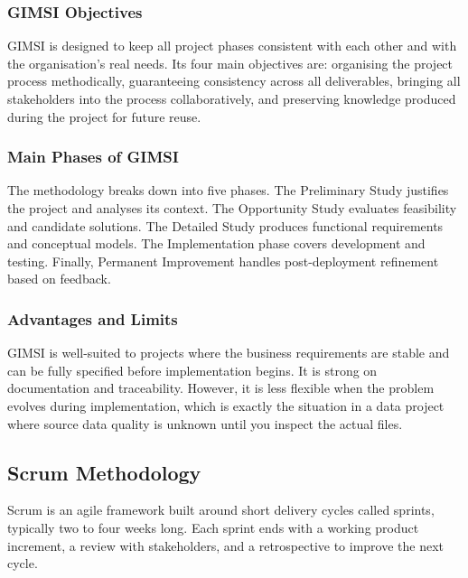 \documentclass[12pt, a4paper]{report}
\begin{document}

\subsubsection{GIMSI Objectives}

GIMSI is designed to keep all project phases consistent with each other and with the
organisation's real needs. Its four main objectives are: organising the project
process methodically, guaranteeing consistency across all deliverables, bringing
all stakeholders into the process collaboratively, and preserving knowledge produced
during the project for future reuse.

\subsubsection{Main Phases of GIMSI}

The methodology breaks down into five phases. The Preliminary Study justifies the
project and analyses its context. The Opportunity Study evaluates feasibility and
candidate solutions. The Detailed Study produces functional requirements and
conceptual models. The Implementation phase covers development and testing. Finally,
Permanent Improvement handles post-deployment refinement based on feedback.

\subsubsection{Advantages and Limits}

GIMSI is well-suited to projects where the business requirements are stable and
can be fully specified before implementation begins. It is strong on documentation
and traceability. However, it is less flexible when the problem evolves during
implementation, which is exactly the situation in a data project where source data
quality is unknown until you inspect the actual files.

\subsection{Scrum Methodology}

Scrum is an agile framework built around short delivery cycles called sprints,
typically two to four weeks long. Each sprint ends with a working product increment,
a review with stakeholders, and a retrospective to improve the next cycle.
\end{document}

